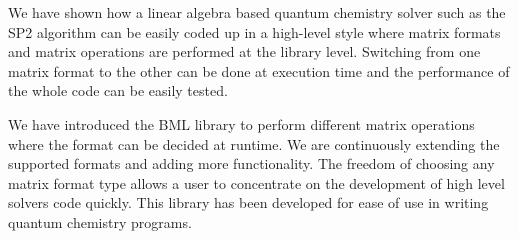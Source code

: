 We have shown how a linear algebra based quantum chemistry solver such as the SP2 algorithm can be easily coded up in a high-level style where matrix formats and matrix operations are performed at the library level. Switching from one matrix format to the other can be done at execution time and the performance of the whole code can be easily tested. 

We have introduced the BML library to perform different matrix operations where the format can be decided at runtime. We are continuously extending the supported formats and adding more functionality. The freedom of choosing any matrix format type allows a user to concentrate on the development of high level solvers code quickly. This library has been developed for ease of use in writing quantum chemistry programs.


%  
% 

 
